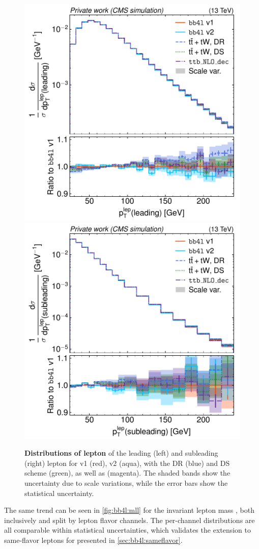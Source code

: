 \begin{figure}[tp]
    \centering
    \includegraphics[width=0.49 \textwidth]{figures/bb4l/generators/MC_TTBAR_DILEP_SPINDENSITY_lep_pt_1.pdf}
    \hfill
    \includegraphics[width=0.49 \textwidth]{figures/bb4l/generators/MC_TTBAR_DILEP_SPINDENSITY_lep_pt_2.pdf}
    \caption{\textbf{Distributions of lepton \pt} of the leading (left) and subleading
      (right) lepton for
      \bbfourl v1 (red), v2 (aqua), \tttWsum with the DR (blue) and DS scheme
      (green), as well as \ttb (magenta). The shaded bands show the
      uncertainty due to scale variations, while the error bars show
      the statistical uncertainty.}
    \label{fig:bb4l:leppt}
\end{figure}

The same trend can be seen in \cref{fig:bb4l:mll} for the invariant lepton mass \mll, both inclusively and split by lepton flavor channels. The per-channel distributions are all comparable within statistical uncertainties, which validates the extension to same-flavor leptons for \bbfourl presented in \cref{sec:bb4l:sameflavor}.

